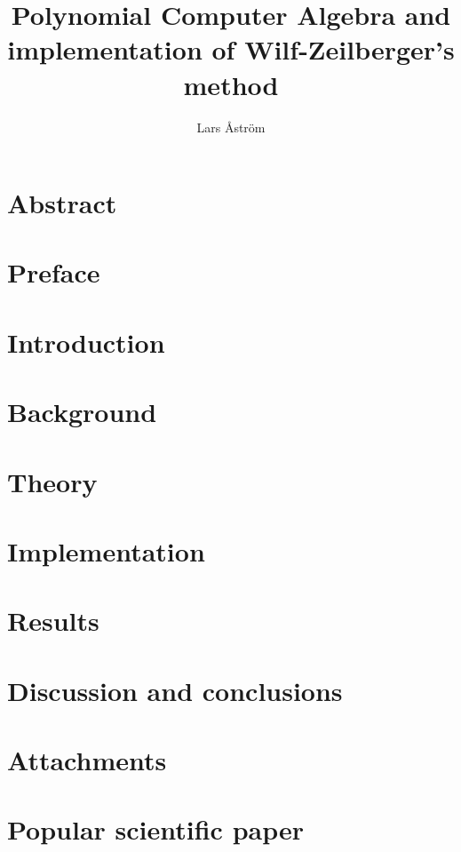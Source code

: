 \documentclass{LTHthesis}
\theoremstyle{definition}
\begin{document}
\begin{titlepages}
\author{Lars Åström}
\title{Polynomial Computer Algebra and implementation of Wilf-Zeilberger's method}
\end{titlepages}
\chapter*{Abstract}



\chapter*{Preface}


\tableofcontents

\chapter{Introduction}\label{Ch: Introduction}


\chapter{Background}\label{Ch: Background}


\chapter{Theory}\label{Ch: Theory}


\chapter{Implementation}\label{Ch: Implementation}


\chapter{Results}\label{Ch: Results}


\chapter{Discussion and conclusions}\label{Ch: Discussion and conclusions}


\begin{thebibliography}{99}

\end{thebibliography}

\chapter{Attachments}


\chapter{Popular scientific paper}

\end{document}
